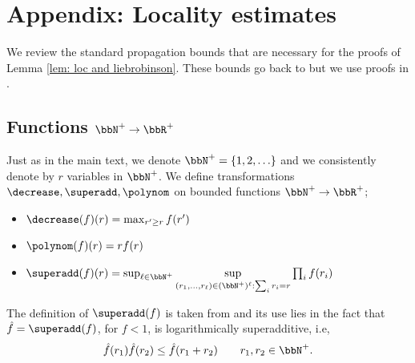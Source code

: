 \section{Appendix: Locality estimates}\label{app: locality}
We review the standard propagation bounds that are necessary for the proofs of Lemma \ref{lem: loc and liebrobinson}.  These bounds go back to 
\cite{Lieb:1972ts} but we use proofs in \cite{nachtergaele2019quasi}. 


\subsection{Functions $\bbN^+\to \bbR^+$}\label{subsec:F}
Just as in the main text, we denote $\bbN^{+}=\{1,2,\ldots\}$ and we consistently denote by $r$ variables in $\bbN^+$.
We define transformations $\decrease,\superadd, \polynom$ on bounded functions $\bbN^+\to\bbR^+$;
\begin{itemize}
	\item  $\decrease(f)(r)=\max_{r'\geq r} f(r')$
	\item $\polynom(f)(r)=r f(r) $
	\item  $\superadd(f)(r)= \sup_{\ell\in\bbN^+}\mathop{\sup}\limits_{(r_1,\ldots,r_\ell) \in (\bbN^+)^\ell: \sum_i r_i=r } \prod_{i} f(r_i)
	$
\end{itemize}
The definition of $\superadd(f)$ is taken from \cite{bruckner1960minimal} and its use lies in the fact that $\hat f=\superadd(f)$, for $f<1$,  is logarithmically {superadditive}, i.e,\, 
\begin{equation}\label{eq: log subadditive}
	\hat f(r_1)\hat f (r_2)\leq \hat f (r_1+r_2)\qquad r_1,r_2 \in \bbN^+.
\end{equation}

